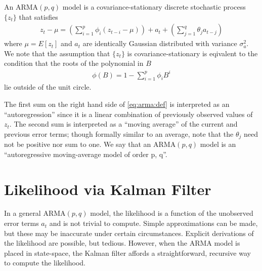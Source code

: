 \label{lab:arma}

An $\text{ARMA}(p,q)$ model is a covariance-stationary discrete stochastic
process $\{z_t\}$ that satisfies
\begin{align}
    \label{eq:arma:def}
    z_t - \mu = \left(\sum_{i=1}^p \phi_{i}(z_{t - i} - \mu)\right) + a_t +
    \left(\sum_{j=1}^{q} \theta_{j}a_{t-j} \right)
\end{align}
where $\mu = E[z_t]$ and $a_t$ are identically Gaussian distributed with
variance $\sigma_a^2$. We note that the assumption that $\{z_t\}$ is
covariance-stationary is eqivalent to the condition that the roots of the
polynomial in $B$
\begin{align}
    \label{eq:arma:characteristic}
    \phi(B) = 1 - \sum_{i=1}^p\phi_iB^i
\end{align}
lie outside of the unit circle.

The first sum on the right hand side of \ref{eq:arma:def} is interpreted as an
``autoregression'' since it is a linear combination of previously observed
values of $z_t$. The second sum is interpreted as a ``moving average'' of the
current and previous error terms; though formally similar to an average, note
that the $\theta_j$ need not be positive nor sum to one. We say that an
$\text{ARMA}(p,q)$ model is an ``autoregressive moving-average model of order
p, q''.

\section*{Likelihood via Kalman Filter}

In a general $\text{ARMA}(p,q)$ model, the likelihood is a function of the
unobserved error terms $a_t$ and is not trivial to compute. Simple
approximations can be made, but these may be inaccurate under certain
circumstances. Explicit derivations of the likelihood are possible, but
tedious. However, when the $\text{ARMA}$ model is placed in state-space, the
Kalman filter affords a straightforward, recursive way to compute the
likelihood.

